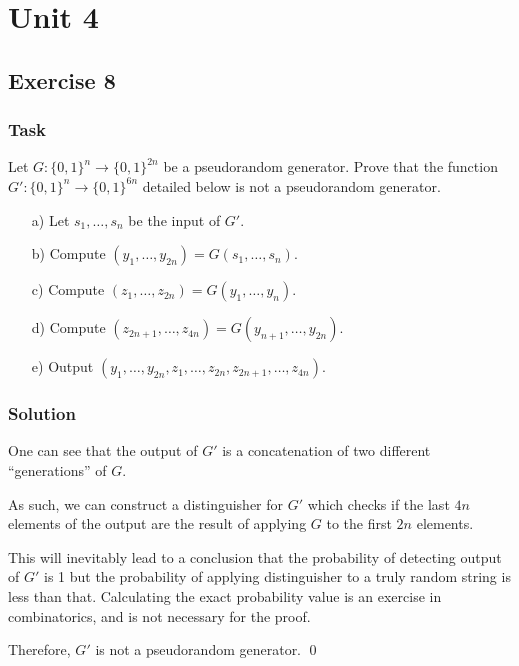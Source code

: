 \chapter{Unit 4}
\section{Exercise 8}

\subsection{Task}
Let $G : \{0, 1\}^n \to \{0, 1\}^{2n}$ be a pseudorandom generator.
Prove that the function $G' : \{0, 1\}^n \to \{0, 1\}^{6n}$ detailed below is not a pseudorandom generator.

\begin{enumerate}
    \item[a)] Let $s_1, \ldots, s_n$ be the input of $G'$.
    \item[b)] Compute $(y_1, \ldots, y_{2n}) = G(s_1, \ldots, s_n)$.
    \item[c)] Compute $(z_1, \ldots, z_{2n}) = G(y_1, \ldots, y_n)$.
    \item[d)] Compute $(z_{2n+1}, \ldots, z_{4n}) = G(y_{n+1}, \ldots, y_{2n})$.
    \item[e)] Output $(y_1, \ldots, y_{2n}, z_1, \ldots, z_{2n}, z_{2n+1}, \ldots, z_{4n})$.
\end{enumerate}

\subsection{Solution}

One can see that the output of $G'$ is a concatenation of two different ``generations'' of $G$.

As such, we can construct a distinguisher for $G'$ which checks if the last $4n$ elements of the output are the result of applying $G$ to the first $2n$ elements.

This will inevitably lead to a conclusion that the probability of detecting output of $G'$ is 1 but the probability of applying distinguisher to a truly random string is less than that.
Calculating the exact probability value is an exercise in combinatorics, and is not necessary for the proof.

Therefore, $G'$ is not a pseudorandom generator. \qed
